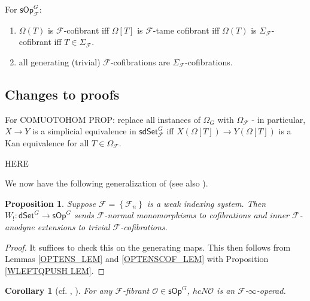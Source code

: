 \documentclass[a4paper,10pt]{article}%
\numberwithin{equation}{section}
\numberwithin{figure}{section}
\newtheorem{proposition}[equation]{Proposition}%
\newtheorem{corollary}[equation]{Corollary}%
\theoremstyle{definition} %
\newcommand{\set}[1]{\left\{#1\right\}}%
\newcommand{\sOp}{\ensuremath{\mathsf{sOp}}}%
\newcommand{\dSet}{\mathsf{dSet}}
\newcommand{\F}{\ensuremath{\mathcal F}}
\renewcommand{\O}{\ensuremath{\mathcal O}}
\newcommand{\1}{\ensuremath{\mathbbm 1}}%
\begin{document}
For $\sOp^G_\F$:
\begin{enumerate}
\item $\Omega(T)$ is $\F$-cofibrant iff $\Omega[T]$ is $\F$-tame cofibrant iff $\Omega(T)$ is $\Sigma_\F$-cofibrant iff $T \in \Sigma_\F$.
\item all generating (trivial) $\F$-cofibrations are $\Sigma_\F$-cofibrations.
\end{enumerate}


\subsection{Changes to proofs}



For COMUOTOHOM PROP: replace all instances of $\Omega_G$ with $\Omega_{\mathcal F}$ - in particular, $X \to Y$ is a simplicial equivalence in $\mathsf{sdSet}^G_{\mathcal F}$ iff $X(\Omega[T]) \to Y(\Omega[T])$ is a Kan equivalence for all $T \in \Omega_{\mathcal F}$. 










{\color{red} HERE}




We now have the following generalization of \cite[Prop 4.5]{CM13b} (see also \cite[Prop. 6.15]{Per18}).


\begin{proposition}
	\label{W!_COF_PROP}
	Suppose $\F = \set{\F_n}$ is a weak indexing system.
	Then $W_! \colon \dSet^G \to \sOp^G$ sends $\F$-normal monomorphisms to cofibrations and inner $\F$-anodyne extensions to trivial $\F$-cofibrations.
\end{proposition}

\begin{proof}
	It suffices to check this on the generating maps.
	This then follows from
	Lemmas \ref{OPTENS_LEM} and \ref{OPTENSCOF_LEM} with Proposition \ref{WLEFTQPUSH LEM}.
\end{proof}




\begin{corollary}
	[{cf. \cite[Prop. 6.15]{Per18}, \cite[Cor. 4.6]{CM11}}]
	For any $\F$-fibrant $\O \in \sOp^G$, $h c N \O$ is an $\F$-$\infty$-operad.
\end{corollary}




\fi
\end{document}
